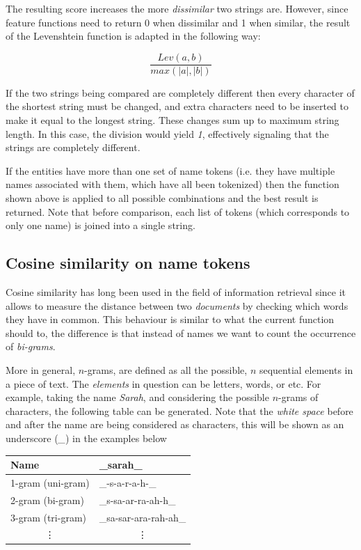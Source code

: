 \documentclass[epsfig,a4paper,11pt,titlepage,twoside,openany]{book}
\begin{document}
The resulting score increases the more \textit{dissimilar} two strings are. However, since feature functions need to return 0 when dissimilar and 1 when similar, the result of the Levenshtein function is adapted in the following way:

\begin{equation*}
    \frac{Lev(a,b)}{max(|a|,|b|)}
\end{equation*}

If the two strings being compared are completely different then every character of the shortest string must be changed, and extra characters need to be inserted to make it equal to the longest string. These changes sum up to maximum string length. In this case, the division would yield \textit{1}, effectively signaling that the strings are completely different. 

If the entities have more than one set of name tokens (i.e. they have multiple names associated with them, which have all been tokenized) then the function shown above is applied to all possible combinations and the best result is returned. Note that before comparison, each list of tokens (which corresponds to only one name) is joined into a single string.

\subsection{Cosine similarity on name tokens}
\label{sec:feature-kernel-similarity-name-tokens}

Cosine similarity has long been used in the field of information retrieval \cite{singhal_modern_information_retrieval} since it allows to measure the distance between two \textit{documents} by checking which words they have in common. This behaviour is similar to what the current function should to, the difference is that instead of names we want to count the occurrence of \textit{bi-grams}. 

More in general, $n$-grams, are defined as all the possible, $n$ sequential elements in a piece of text. The \textit{elements} in question can be letters, words, or etc. For example, taking the name \textit{Sarah}, and considering the possible $n$-grams of characters, the following table can be generated. Note that the \textit{white space} before and after the name are being considered as characters, this will be shown as an underscore (\textit{\_}) in the examples below

\begin{table}[H]
\centering
\begin{tabular}{l|l}
Name                       & \_sarah\_                     \\ \hline
1-gram (uni-gram)          & \_-s-a-r-a-h-\_                 \\ \hline
2-gram (bi-gram)           & \_s-sa-ar-ra-ah-h\_           \\ \hline
3-gram (tri-gram)          & \_sa-sar-ara-rah-ah\_         \\ \hline
\multicolumn{1}{c|}{\vdots} & \multicolumn{1}{c}{\vdots}
\end{tabular}
\label{tab:ngram-generation-example}
\end{table}
\end{document}
